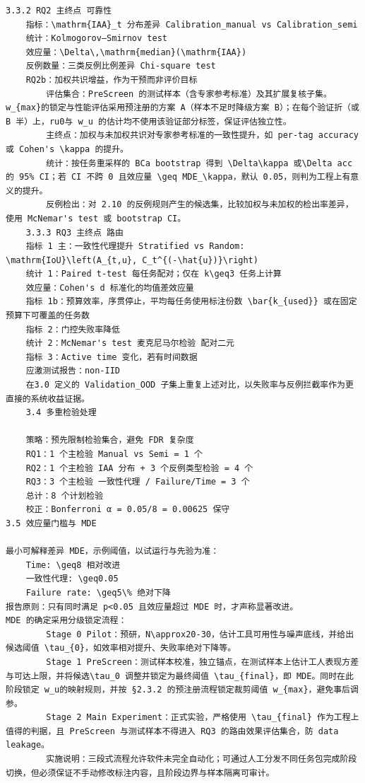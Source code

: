 \documentclass[a4paper,12pt]{article}
\begin{document}
\begin{Verbatim}[fontsize=\small,breaklines=true,breakanywhere=true]
	3.3.2 RQ2 主终点 可靠性
	指标：\mathrm{IAA}_t 分布差异 Calibration_manual vs Calibration_semi
	统计：Kolmogorov–Smirnov test
	效应量：\Delta\,\mathrm{median}(\mathrm{IAA})
	反例数量：三类反例比例差异 Chi-square test
	RQ2b：加权共识增益，作为干预而非评价目标
		评估集合：PreScreen 的测试样本（含专家参考标准）及其扩展复核子集。w_{max}的锁定与性能评估采用预注册的方案 A（样本不足时降级方案 B）；在每个验证折（或 B 半）上，ru0与 w_u 的估计均不使用该验证部分标签，保证评估独立性。
		主终点：加权与未加权共识对专家参考标准的一致性提升，如 per-tag accuracy 或 Cohen's \kappa 的提升。
		统计：按任务重采样的 BCa bootstrap 得到 \Delta\kappa 或\Delta acc 的 95% CI；若 CI 不跨 0 且效应量 \geq MDE_\kappa，默认 0.05，则判为工程上有意义的提升。
		反例检出：对 2.10 的反例规则产生的候选集，比较加权与未加权的检出率差异，使用 McNemar's test 或 bootstrap CI。
	3.3.3 RQ3 主终点 路由
	指标 1 主：一致性代理提升 Stratified vs Random: \mathrm{IoU}\left(A_{t,u}, C_t^{(-\hat{u})}\right)
	统计 1：Paired t-test 每任务配对；仅在 k\geq3 任务上计算
	效应量：Cohen's d 标准化的均值差效应量
	指标 1b：预算效率，序贯停止，平均每任务使用标注份数 \bar{k_{used}} 或在固定预算下可覆盖的任务数
	指标 2：门控失败率降低
	统计 2：McNemar's test 麦克尼马尔检验 配对二元
	指标 3：Active time 变化，若有时间数据
	应激测试报告：non-IID
	在3.0 定义的 Validation_OOD 子集上重复上述对比，以失败率与反例拦截率作为更直接的系统收益证据。
	3.4 多重检验处理

	策略：预先限制检验集合，避免 FDR 复杂度
	RQ1：1 个主检验 Manual vs Semi = 1 个
	RQ2：1 个主检验 IAA 分布 + 3 个反例类型检验 = 4 个
	RQ3：3 个主检验 一致性代理 / Failure/Time = 3 个
	总计：8 个计划检验
	校正：Bonferroni α = 0.05/8 = 0.00625 保守
3.5 效应量门槛与 MDE

最小可解释差异 MDE，示例阈值，以试运行与先验为准：
	Time: \geq8 相对改进
	一致性代理: \geq0.05
	Failure rate: \geq5\% 绝对下降
报告原则：只有同时满足 p<0.05 且效应量超过 MDE 时，才声称显著改进。
MDE 的确定采用分级锁定流程：
		Stage 0 Pilot：预研，N\approx20-30，估计工具可用性与噪声底线，并给出候选阈值 \tau_{0}，如效率相对提升、失败率绝对下降等。
		Stage 1 PreScreen：测试样本校准，独立锚点，在测试样本上估计工人表现方差与可达上限，并将候选\tau_0 调整并锁定为最终阈值 \tau_{final}，即 MDE。同时在此阶段锁定 w_u的映射规则，并按 §2.3.2 的预注册流程锁定裁剪阈值 w_{max}，避免事后调参。
		Stage 2 Main Experiment：正式实验，严格使用 \tau_{final} 作为工程上值得的判据，且 PreScreen 与测试样本不得进入 RQ3 的路由效果评估集合，防 data leakage。
		实施说明：三段式流程允许软件未完全自动化；可通过人工分发不同任务包完成阶段切换，但必须保证不手动修改标注内容，且阶段边界与样本隔离可审计。


\end{Verbatim}
\end{document}
